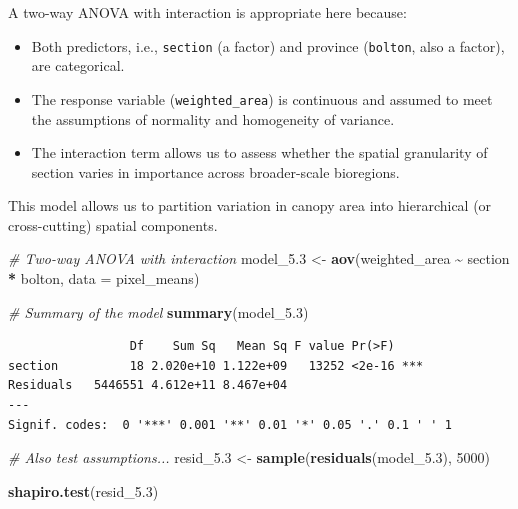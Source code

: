 \documentclass[
  british,
  10pt,
]{article}
\newenvironment{Shaded}{\begin{snugshade}}{\end{snugshade}}
\newcommand{\AttributeTok}[1]{\textcolor[rgb]{0.13,0.29,0.53}{#1}}
\newcommand{\CommentTok}[1]{\textcolor[rgb]{0.56,0.35,0.01}{\textit{#1}}}
\newcommand{\DecValTok}[1]{\textcolor[rgb]{0.00,0.00,0.81}{#1}}
\newcommand{\FloatTok}[1]{\textcolor[rgb]{0.00,0.00,0.81}{#1}}
\newcommand{\FunctionTok}[1]{\textcolor[rgb]{0.13,0.29,0.53}{\textbf{#1}}}
\newcommand{\NormalTok}[1]{#1}
\newcommand{\OtherTok}[1]{\textcolor[rgb]{0.56,0.35,0.01}{#1}}
\newcommand{\SpecialCharTok}[1]{\textcolor[rgb]{0.81,0.36,0.00}{\textbf{#1}}}
\providecommand{\tightlist}{%
  \setlength{\itemsep}{0pt}\setlength{\parskip}{0pt}}
\let\oldtexttt\texttt
\renewcommand{\texttt}[1]{\oldtexttt{\small #1}}
\begin{document}
A two-way ANOVA with interaction is appropriate here because:

\begin{itemize}
\tightlist
\item
  Both predictors, i.e., \texttt{section} (a factor) and province
  (\texttt{bolton}, also a factor), are categorical.
\item
  The response variable (\texttt{weighted\_area}) is continuous and
  assumed to meet the assumptions of normality and homogeneity of
  variance.
\item
  The interaction term allows us to assess whether the spatial
  granularity of section varies in importance across broader-scale
  bioregions.
\end{itemize}

This model allows us to partition variation in canopy area into
hierarchical (or cross-cutting) spatial components.

\begin{Shaded}
\begin{Highlighting}[]
\CommentTok{\# Two{-}way ANOVA with interaction}
\NormalTok{model\_5}\FloatTok{.3} \OtherTok{\textless{}{-}} \FunctionTok{aov}\NormalTok{(weighted\_area }\SpecialCharTok{\textasciitilde{}}\NormalTok{ section }\SpecialCharTok{*}\NormalTok{ bolton, }\AttributeTok{data =}\NormalTok{ pixel\_means)}

\CommentTok{\# Summary of the model}
\FunctionTok{summary}\NormalTok{(model\_5}\FloatTok{.3}\NormalTok{)}
\end{Highlighting}
\end{Shaded}

\begin{verbatim}
                 Df    Sum Sq   Mean Sq F value Pr(>F)    
section          18 2.020e+10 1.122e+09   13252 <2e-16 ***
Residuals   5446551 4.612e+11 8.467e+04                   
---
Signif. codes:  0 '***' 0.001 '**' 0.01 '*' 0.05 '.' 0.1 ' ' 1
\end{verbatim}

\begin{Shaded}
\begin{Highlighting}[]
\CommentTok{\# Also test assumptions...}
\NormalTok{resid\_5}\FloatTok{.3} \OtherTok{\textless{}{-}} \FunctionTok{sample}\NormalTok{(}\FunctionTok{residuals}\NormalTok{(model\_5}\FloatTok{.3}\NormalTok{), }\DecValTok{5000}\NormalTok{)}

\FunctionTok{shapiro.test}\NormalTok{(resid\_5}\FloatTok{.3}\NormalTok{)}
\end{Highlighting}
\end{Shaded}
\end{document}
